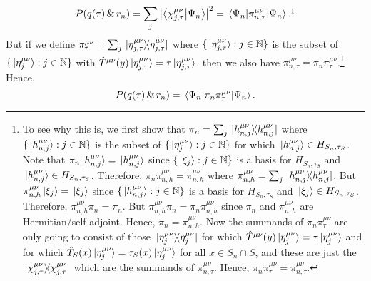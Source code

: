 \begin{equation}\label{pqtauri}
P(q(\tau)\, \& \,r_n)=\sum_j \abs{ \ip{\chi_{j,\tau}^{\mu\nu}}{\Psi_n}}^2=\ev*{\pi_{n,\tau}^{\mu\nu}}{\Psi_n}.\protect\footnotemark
\end{equation}
But %
%
 if we define $\pi_\tau^{\mu\nu}=\sum_j\dyad*{\eta_{j,\tau}^{\mu\nu}}$ where $\{\ket*{\eta_{j,\tau}^{\mu\nu}}:j\in\mathbb{N}\}$ is %
  the subset of  $\{\ket*{\eta_j^{\mu\nu}}:j\in\mathbb{N}\}$ with $\hat{T}^{\mu\nu}(y)\ket*{\eta_{j,\tau}^{\mu\nu}}=\tau\ket*{\eta_{j,\tau}^{\mu\nu}}$, then we also have  $\pi_{n,\tau}^{\mu\nu}=\pi_n\pi_\tau^{\mu\nu}$.\footnote{To see why this is, 
we first show that $\pi_n=\sum_j\dyad*{h_{n,j}^{\mu\nu}}$ where $\{\ket*{h_{n,j}^{\mu\nu}}:j\in\mathbb{N}\}$ is the subset of $\{\ket*{\eta_j^{\mu\nu}}:j\in\mathbb{N}\}$  for which $\ket*{h_{n,j}^{\mu\nu}}\in H_{S_n,\tau_S}$. 
Note that $\pi_n\ket*{h_{n,j}^{\mu\nu}}=\ket*{h_{n,j}^{\mu\nu}}$    since $\{\ket*{\xi_j}:j\in\mathbb{N}\}$ is a basis for $H_{S_n,\tau_S}$ and $\ket*{h_{n,j}^{\mu\nu}}\in H_{S_n,\tau_S}$. 
Therefore, $\pi_n\pi_{n,h}^{\mu\nu}=\pi_{n,h}^{\mu\nu}$  where  $\pi_{n,h}^{\mu\nu}=\sum_j\dyad*{h_{n,j}^{\mu\nu}}$. 
But  $\pi_{n,h}^{\mu\nu}\ket*{\xi_j}=\ket*{\xi_j}$ since $\{\ket*{h_{n,j}^{\mu\nu}}:j\in\mathbb{N}\}$ is a basis for $H_{S_n,\tau_S}$ and $\ket*{\xi_j}\in H_{S_n,\tau_S}$. 
Therefore, $\pi_{n,h}^{\mu\nu}\pi_n=\pi_n.$ But $\pi_{n,h}^{\mu\nu}\pi_n= \pi_n\pi_{n,h}^{\mu\nu}$ since $\pi_n$ and $\pi_{n,h}^{\mu\nu}$ are Hermitian/self-adjoint. Hence, $\pi_n= \pi_{n,h}^{\mu\nu}$. Now the summands of $\pi_n\pi_\tau^{\mu\nu}$ are only going to consist of those $\dyad*{\eta_j^{\mu\nu}}$ for which $\hat{T}^{\mu\nu}(y)\ket*{\eta_j^{\mu\nu}}=\tau\ket*{\eta_j^{\mu\nu}}$ and for which $\hat{T}_S(x)\ket*{\eta_j^{\mu\nu}}=\tau_S(x)\ket*{\eta_j^{\mu\nu}}$ for all $x\in S_n\cap S$, and these are just the $\dyad*{\chi_{j,\tau}^{\mu\nu}}$ which are the summands of  $\pi_{n,\tau}^{\mu\nu}$. Hence,  $\pi_n\pi_\tau^{\mu\nu}=\pi_{n,\tau}^{\mu\nu}.$} 
  Hence,
\begin{equation}\label{pqtauri2}
P(q(\tau)\, \& \, r_n)=\ev*{\pi_n\pi_\tau^{\mu\nu}}{\Psi_n}.
\end{equation}
